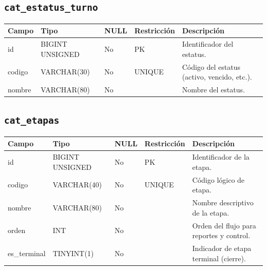 \documentclass[12pt,a4paper]{article}
\begin{document}
\subsection{\texttt{cat\_estatus\_turno}}
\begin{longtable}{L{3.2cm} L{3.2cm} C{1.2cm} L{2.6cm} L{5.2cm}}
\toprule
\textbf{Campo} & \textbf{Tipo} & \textbf{NULL} & \textbf{Restricción} & \textbf{Descripción} \\
\midrule
\endhead
id & BIGINT UNSIGNED & No & PK & Identificador del estatus. \\
codigo & VARCHAR(30) & No & UNIQUE & Código del estatus (activo, vencido, etc.). \\
nombre & VARCHAR(80) & No &  & Nombre del estatus. \\
\bottomrule
\end{longtable}

\subsection{\texttt{cat\_etapas}}
\begin{longtable}{L{3.2cm} L{3.2cm} C{1.2cm} L{2.6cm} L{5.2cm}}
\toprule
\textbf{Campo} & \textbf{Tipo} & \textbf{NULL} & \textbf{Restricción} & \textbf{Descripción} \\
\midrule
\endhead
id & BIGINT UNSIGNED & No & PK & Identificador de la etapa. \\
codigo & VARCHAR(40) & No & UNIQUE & Código lógico de etapa. \\
nombre & VARCHAR(80) & No &  & Nombre descriptivo de la etapa. \\
orden & INT & No &  & Orden del flujo para reportes y control. \\
es\_terminal & TINYINT(1) & No &  & Indicador de etapa terminal (cierre). \\
\bottomrule
\end{longtable}

\end{document}
